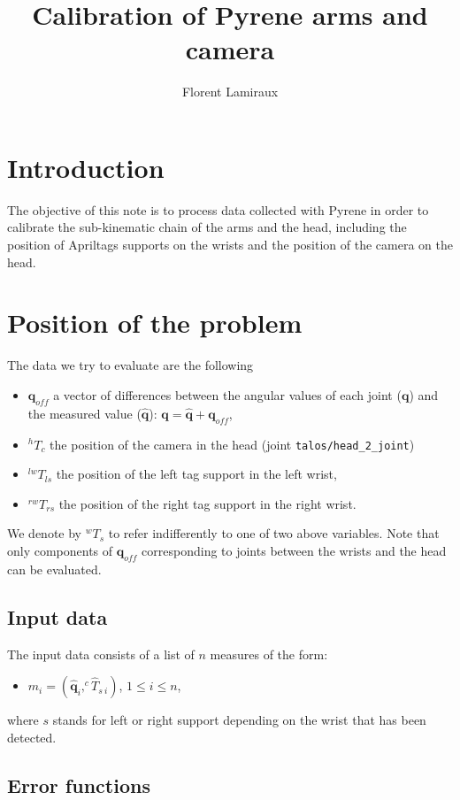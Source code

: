 \documentclass {article}
\title {Calibration of Pyrene arms and camera}
\author {Florent Lamiraux}
\date {}
\newcommand\conf{\mathbf{q}}
\newcommand\confoffset{\mathbf{q}_{off}}
\newcommand\transf{T}
\begin{document}
\maketitle
\section {Introduction}

The objective of this note is to process data collected with Pyrene in order
to calibrate the sub-kinematic chain of the arms and the head, including the
position of Apriltags supports on the wrists and the position of the camera on the head.

\section {Position of the problem}

The data we try to evaluate are the following
\begin{itemize}
\item $\confoffset$ a vector of differences between the angular values of each joint ($\conf$) and the measured value ($\hat{\conf}$): $\conf = \hat{\conf} + \confoffset$,
\item $^{h}\transf_{c}$ the position of the camera in the head (joint \texttt{talos/head\_2\_joint})
\item $^{lw}\transf_{ls}$ the position of the left tag support in the left wrist,
\item $^{rw}\transf_{rs}$ the position of the right tag support in the right
  wrist.
\end{itemize}
We denote by $^{w}\transf_{s}$ to refer indifferently to one of two above variables.
Note that only components of $\confoffset$ corresponding to joints between the wrists and the head can be evaluated.

\subsection {Input data}

The input data consists of a list of $n$ measures of the form:
\begin{itemize}
  \item $m_i = (\hat{\conf}_i, ^{c}\hat\transf_{s\ i})$, $1 \leq i \leq n$,
\end{itemize}
where $s$ stands for left or right support depending on the wrist that has been detected.

\subsection {Error functions}
\end{document}
